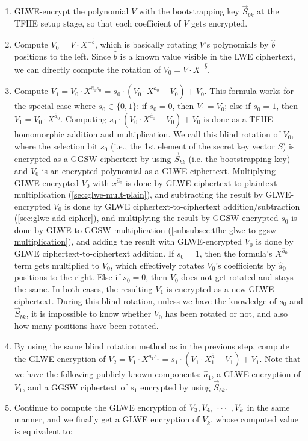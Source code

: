 \begin{enumerate}
\item GLWE-encrypt the polynomial $V$ with the bootstrapping key $\vec{S}_{bk}$ at the TFHE setup stage, so that each coefficient of $V$ gets encrypted.
\item Compute $V_0 = V \cdot X^{-\hat{b}}$, which is basically rotating $V$'s polynomials by $\hat{b}$ positions to the left. Since $\hat{b}$ is a known value visible in the LWE ciphertext, we can directly compute the rotation of $V_0 = V \cdot X^{-\hat{b}}$. 
\item Compute $V_1 = V_0 \cdot X^{\hat{a}_0s_0} = s_0 \cdot (V_0 \cdot X^{\hat{a}_0} - V_0) + V_0$.  
This formula works for the special case where $s_0 \in \{0, 1\}$: if $s_0 = 0$, then $V_1 = V_0$; else if $s_0 = 1$, then $V_1 = V_0 \cdot X^{\hat{a}_0}$. Computing $s_0 \cdot (V_0 \cdot X^{\hat{a}_0} - V_0) + V_0$ is done as a TFHE homomorphic addition and multiplication. We call this blind rotation of $V_0$, where the selection bit $s_0$ (i.e., the 1st element of the secret key vector $S$) is encrypted as a GGSW ciphertext by using $\vec{S}_{bk}$ (i.e. the bootstrapping key) and $V_0$ is an encrypted polynomial as a GLWE ciphertext. Multiplying GLWE-encrypted $V_0$ with $x^{\hat{a}_0}$ is done by GLWE ciphertext-to-plaintext multiplication (\autoref{sec:glwe-mult-plain}), and subtracting the result by GLWE-encrypted $V_0$ is done by GLWE ciphertext-to-ciphertext addition/subtraction (\autoref{sec:glwe-add-cipher}), and multiplying the result by GGSW-encrypted $s_0$ is done by GLWE-to-GGSW multiplication (\autoref{subsubsec:tfhe-glwe-to-ggsw-multiplication}), and adding the result with GLWE-encrypted $V_0$ is done by GLWE ciphertext-to-ciphertext addition. If $s_0 = 1$, then the formula's $X^{\hat{a}_0}$ term gets multiplied to $V_0$, which effectively rotates $V_0$'s coefficients by $\hat{a}_0$ positions to the right. Else if $s_0 = 0$, then $V_0$ does not get rotated and stays the same. In both cases, the resulting $V_1$ is encrypted as a new GLWE ciphertext. During this blind rotation, unless we have the knowledge of $s_0$ and $\vec{S}_{bk}$, it is impossible to know whether $V_0$ has been rotated or not, and also how many positions have been rotated.
\item By using the same blind rotation method as in the previous step, compute the GLWE encryption of $V_2 = V_1 \cdot X^{\hat{a}_1s_1} = s_1 \cdot (V_1 \cdot X^{\hat{a}}_1 - V_1) + V_1$. Note that we have the following publicly known components: $\hat{a}_1$, a GLWE encryption of $V_1$, and a GGSW ciphertext of $s_1$ encrypted by using $\vec{S}_{bk}$. 
\item Continue to compute the GLWE encryption of $V_3, V_4, \text{ } \text{$\cdots$} \text{ }, V_k$ in the same manner, and we finally get a GLWE encryption of $V_k$, whose computed value is equivalent to:


\end{enumerate}

